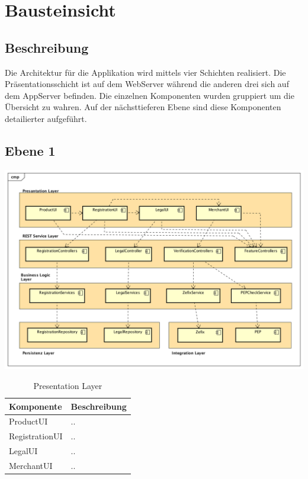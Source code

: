 \graphicspath{{./images/}}

\chapter{Bausteinsicht}

\section{Beschreibung}

Die Architektur für die Applikation wird mittels vier Schichten realisiert. Die Präsentationsschicht ist auf dem WebServer während die anderen drei sich auf dem AppServer befinden. Die einzelnen Komponenten wurden gruppiert um die Übersicht zu wahren. Auf der nächsttieferen Ebene sind diese Komponenten detailierter aufgeführt.

\begin{landscape}
\section{Ebene 1}

\begin{center}
	\includegraphics[scale=0.6]{ComponentLevel1.png}
\end{center}

\end{landscape}
\restoregeometry

\begin{table}[H]
	\centering
	\caption{Presentation Layer}
	\begin{tabular}{ | p{4cm} | p{12cm} | }
		\toprule
		{\textbf{Komponente}} & {\textbf{Beschreibung}} \\
		\midrule
		ProductUI &  .. \\ \hline
		RegistrationUI &  .. \\ \hline
		LegalUI &  .. \\ \hline
		MerchantUI &  .. \\
		\bottomrule
	\end{tabular}
\end{table}

